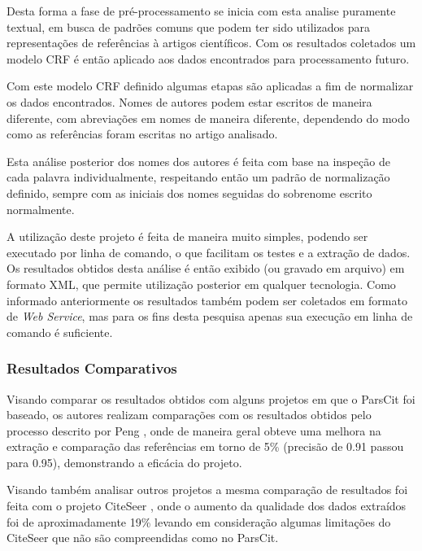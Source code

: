 Desta forma a fase de pré-processamento se inicia com esta analise puramente textual, em busca de padrões comuns que podem ter sido utilizados para representações de referências à artigos científicos. Com os resultados coletados um modelo CRF é então aplicado aos dados encontrados para processamento futuro.

Com este modelo CRF definido algumas etapas são aplicadas a fim de normalizar os dados encontrados. Nomes de autores podem estar escritos de maneira diferente, com abreviações em nomes de maneira diferente, dependendo do modo como as referências foram escritas no artigo analisado.

Esta análise posterior dos nomes dos autores é feita com base na inspeção de cada palavra individualmente, respeitando então um padrão de normalização definido, sempre com as iniciais dos nomes seguidas do sobrenome escrito normalmente.

A utilização deste projeto é feita de maneira muito simples, podendo ser executado por linha de comando, o que facilitam os testes e a extração de dados. Os resultados obtidos desta análise é então exibido (ou gravado em arquivo) em formato XML, que permite utilização posterior em qualquer tecnologia. Como informado anteriormente os resultados também podem ser coletados em formato de \textit{Web Service}, mas para os fins desta pesquisa apenas sua execução em linha de comando é suficiente.

\subsubsection{Resultados Comparativos}

Visando comparar os resultados obtidos com alguns projetos em que o ParsCit foi baseado, os autores realizam comparações com os resultados obtidos pelo processo descrito por Peng \cite{crf-ie}, onde de maneira geral obteve uma melhora na extração e comparação das referências em torno de 5\% (precisão de 0.91 passou para 0.95), demonstrando a eficácia do projeto.

Visando também analisar outros projetos a mesma comparação de resultados foi feita com o projeto CiteSeer \cite{citeseer}, onde o aumento da qualidade dos dados extraídos foi de aproximadamente 19\% levando em consideração algumas limitações do CiteSeer que não são compreendidas como no ParsCit.


	

